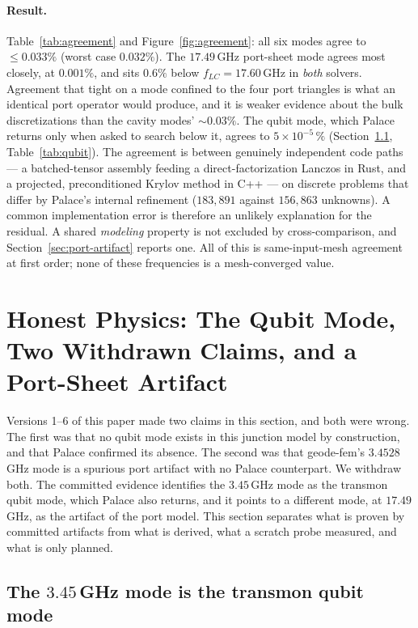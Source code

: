 \documentclass{anvil-paper}
\begin{document}
\paragraph{Result.}
Table~\ref{tab:agreement} and Figure~\ref{fig:agreement}: all six modes agree to $\leq 0.033\%$ (worst
case $0.032\%$). The $17.49$\,GHz port-sheet mode agrees most closely,
at $0.001\%$, and sits $0.6\%$ below $f_{LC} = 17.60$\,GHz in \emph{both}
solvers. Agreement that tight on a mode confined to the four port
triangles is what an identical port operator would produce, and it is
weaker evidence about the bulk discretizations than the cavity modes'
${\sim}0.03\%$. The qubit mode, which Palace returns only when asked to
search below it, agrees to $5\times10^{-5}\,\%$
(Section~\ref{sec:qubit-mode}, Table~\ref{tab:qubit}). The agreement is
between genuinely independent code paths --- a batched-tensor assembly
feeding a direct-factorization Lanczos in Rust, and a projected,
preconditioned Krylov method in C++ --- on discrete problems that
differ by Palace's internal refinement ($183{,}891$ against $156{,}863$
unknowns). A common implementation error is therefore an unlikely
explanation for the residual. A shared \emph{modeling} property is not
excluded by cross-comparison, and Section~\ref{sec:port-artifact}
reports one. All of this is same-input-mesh agreement at first order;
none of these frequencies is a mesh-converged value.

\section{Honest Physics: The Qubit Mode, Two Withdrawn Claims, and a
Port-Sheet Artifact}
\label{sec:honest-physics}

Versions 1--6 of this paper made two claims in this section, and both
were wrong. The first was that no qubit mode exists in this junction
model by construction, and that Palace confirmed its absence. The second
was that geode-fem's $3.4528$\,GHz mode is a spurious port artifact with
no Palace counterpart. We withdraw both. The committed evidence
identifies the $3.45$\,GHz mode as the transmon qubit mode, which Palace
also returns, and it points to a different mode, at $17.49$\,GHz, as the
artifact of the port model. This section separates what is proven by
committed artifacts from what is derived, what a scratch probe measured,
and what is only planned.

\subsection{The \texorpdfstring{$3.45$\,GHz}{3.45 GHz} mode is the transmon qubit mode}
\label{sec:qubit-mode}
\end{document}
